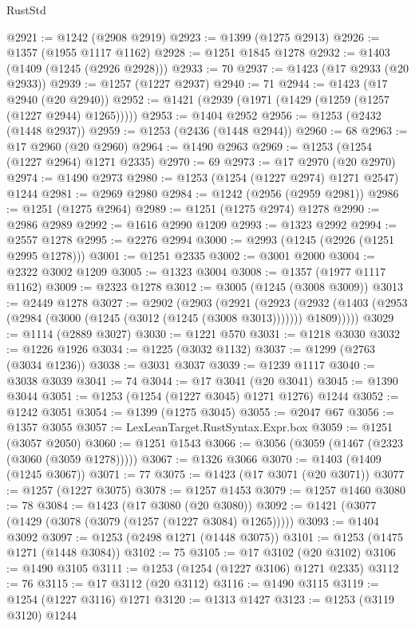 \begin{lexlean}{RustStd}
\begin{coremodule}
@2921 := @1242 (@2908 @2919)
@2923 := @1399 (@1275 @2913)
@2926 := @1357 (@1955 @1117 @1162)
@2928 := @1251 @1845 @1278
@2932 := @1403 (@1409 (@1245 (@2926 @2928)))
@2933 := 70
@2937 := @1423 (@17 @2933 (@20 @2933))
@2939 := @1257 (@1227 @2937)
@2940 := 71
@2944 := @1423 (@17 @2940 (@20 @2940))
@2952 := @1421 (@2939 (@1971 (@1429 (@1259 (@1257 (@1227 @2944) @1265)))))
@2953 := @1404 @2952
@2956 := @1253 (@2432 (@1448 @2937))
@2959 := @1253 (@2436 (@1448 @2944))
@2960 := 68
@2963 := @17 @2960 (@20 @2960)
@2964 := @1490 @2963
@2969 := @1253 (@1254 (@1227 @2964) @1271 @2335)
@2970 := 69
@2973 := @17 @2970 (@20 @2970)
@2974 := @1490 @2973
@2980 := @1253 (@1254 (@1227 @2974) @1271 @2547) @1244
@2981 := @2969 @2980
@2984 := @1242 (@2956 (@2959 @2981))
@2986 := @1251 (@1275 @2964)
@2989 := @1251 (@1275 @2974) @1278
@2990 := @2986 @2989
@2992 := @1616 @2990 @1209
@2993 := @1323 @2992
@2994 := @2557 @1278
@2995 := @2276 @2994
@3000 := @2993 (@1245 (@2926 (@1251 @2995 @1278)))
@3001 := @1251 @2335
@3002 := @3001 @2000
@3004 := @2322 @3002 @1209
@3005 := @1323 @3004
@3008 := @1357 (@1977 @1117 @1162)
@3009 := @2323 @1278
@3012 := @3005 (@1245 (@3008 @3009))
@3013 := @2449 @1278
@3027 := @2902
    (@2903
      (@2921
        (@2923
          (@2932 (@1403 (@2953 (@2984 (@3000 (@1245 (@3012 (@1245 (@3008 @3013))))))) @1809)))))
@3029 := @1114 (@2889 @3027)
@3030 := @1221 @570
@3031 := @1218 @3030
@3032 := @1226 @1926
@3034 := @1225 (@3032 @1132)
@3037 := @1299 (@2763 (@3034 @1236))
@3038 := @3031 @3037
@3039 := @1239 @1117
@3040 := @3038 @3039
@3041 := 74
@3044 := @17 @3041 (@20 @3041)
@3045 := @1390 @3044
@3051 := @1253 (@1254 (@1227 @3045) @1271 @1276) @1244
@3052 := @1242 @3051
@3054 := @1399 (@1275 @3045)
@3055 := @2047 @67
@3056 := @1357 @3055
@3057 := LexLeanTarget.RustSyntax.Expr.box
@3059 := @1251 (@3057 @2050)
@3060 := @1251 @1543
@3066 := @3056 (@3059 (@1467 (@2323 (@3060 (@3059 @1278)))))
@3067 := @1326 @3066
@3070 := @1403 (@1409 (@1245 @3067))
@3071 := 77
@3075 := @1423 (@17 @3071 (@20 @3071))
@3077 := @1257 (@1227 @3075)
@3078 := @1257 @1453
@3079 := @1257 @1460
@3080 := 78
@3084 := @1423 (@17 @3080 (@20 @3080))
@3092 := @1421 (@3077 (@1429 (@3078 (@3079 (@1257 (@1227 @3084) @1265)))))
@3093 := @1404 @3092
@3097 := @1253 (@2498 @1271 (@1448 @3075))
@3101 := @1253 (@1475 @1271 (@1448 @3084))
@3102 := 75
@3105 := @17 @3102 (@20 @3102)
@3106 := @1490 @3105
@3111 := @1253 (@1254 (@1227 @3106) @1271 @2335)
@3112 := 76
@3115 := @17 @3112 (@20 @3112)
@3116 := @1490 @3115
@3119 := @1254 (@1227 @3116) @1271
@3120 := @1313 @1427
@3123 := @1253 (@3119 @3120) @1244

\end{coremodule}
\end{lexlean}
